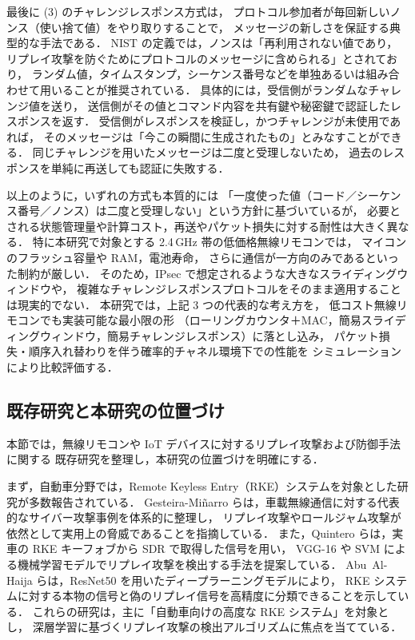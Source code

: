 \documentclass[twocolumn,10pt,a4paper]{jsarticle}
\begin{document}
最後に (3) のチャレンジレスポンス方式は，
プロトコル参加者が毎回新しいノンス（使い捨て値）をやり取りすることで，
メッセージの新しさを保証する典型的な手法である．
NIST の定義では，ノンスは「再利用されない値であり，
リプレイ攻撃を防ぐためにプロトコルのメッセージに含められる」とされており\cite{NISTNonce}，
ランダム値，タイムスタンプ，シーケンス番号などを単独あるいは組み合わせて用いることが推奨されている．
具体的には，受信側がランダムなチャレンジ値を送り，
送信側がその値とコマンド内容を共有鍵や秘密鍵で認証したレスポンスを返す．
受信側がレスポンスを検証し，かつチャレンジが未使用であれば，
そのメッセージは「今この瞬間に生成されたもの」とみなすことができる．
同じチャレンジを用いたメッセージは二度と受理しないため，
過去のレスポンスを単純に再送しても認証に失敗する．

以上のように，いずれの方式も本質的には
「一度使った値（コード／シーケンス番号／ノンス）は二度と受理しない」という方針に基づいているが，
必要とされる状態管理量や計算コスト，再送やパケット損失に対する耐性は大きく異なる．
特に本研究で対象とする 2.4\,GHz 帯の低価格無線リモコンでは，
マイコンのフラッシュ容量や RAM，電池寿命，
さらに通信が一方向のみであるといった制約が厳しい．
そのため，IPsec で想定されるような大きなスライディングウィンドウや，
複雑なチャレンジレスポンスプロトコルをそのまま適用することは現実的でない．
本研究では，上記 3 つの代表的な考え方を，
低コスト無線リモコンでも実装可能な最小限の形
（ローリングカウンタ＋MAC，簡易スライディングウィンドウ，簡易チャレンジレスポンス）に落とし込み，
パケット損失・順序入れ替わりを伴う確率的チャネル環境下での性能を
シミュレーションにより比較評価する．

\subsection{既存研究と本研究の位置づけ}

本節では，無線リモコンや IoT デバイスに対するリプレイ攻撃および防御手法に関する
既存研究を整理し，本研究の位置づけを明確にする．

まず，自動車分野では，Remote Keyless Entry（RKE）システムを対象とした研究が多数報告されている．
Gesteira-Miñarro らは，車載無線通信に対する代表的なサイバー攻撃事例を体系的に整理し，
リプレイ攻撃やロールジャム攻撃が依然として実用上の脅威であることを指摘している\cite{Gesteira2025}．
また，Quintero らは，実車の RKE キーフォブから SDR で取得した信号を用い，
VGG-16 や SVM による機械学習モデルでリプレイ攻撃を検出する手法を提案している\cite{Quintero2023}．
Abu~Al-Haija らは，ResNet50 を用いたディープラーニングモデルにより，
RKE システムに対する本物の信号と偽のリプレイ信号を高精度に分類できることを示している\cite{AbuAlHaija2022}．
これらの研究は，主に「自動車向けの高度な RKE システム」を対象とし，
深層学習に基づくリプレイ攻撃の検出アルゴリズムに焦点を当てている．
\end{document}
